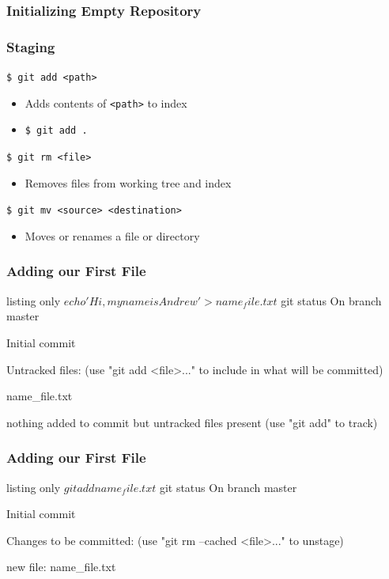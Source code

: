 \documentclass[english,compress]{beamer}
\begin{document}
\begin{frame}[fragile]
    \frametitle{Initializing Empty Repository}
\end{frame}

\begin{frame}[fragile]
    \frametitle{Staging}
    \verb|$ git add <path>|
    \begin{itemize}
        \item Adds contents of \verb|<path>| to index
        \item \verb|$ git add .|
    \end{itemize}
    
    \verb|$ git rm <file>|
    \begin{itemize}
        \item Removes files from working tree and index
    \end{itemize}

    \verb|$ git mv <source> <destination>|
    \begin{itemize}
        \item Moves or renames a file or directory
    \end{itemize}
\end{frame}

\begin{frame}[fragile]
    \frametitle{Adding our First File}
    \begin{tcblisting}{listing only}
$ echo 'Hi, my name is Andrew' > name_file.txt
$ git status
On branch master

Initial commit

Untracked files:
  (use "git add <file>..." to include in what will be committed)

	name_file.txt

nothing added to commit but untracked files present (use "git add" to track)
    \end{tcblisting}
\end{frame}

\begin{frame}[fragile]
    \frametitle{Adding our First File}
    \begin{tcblisting}{listing only}
$ git add name_file.txt
$ git status 
On branch master

Initial commit

Changes to be committed:
  (use "git rm --cached <file>..." to unstage)

	new file:   name_file.txt
    \end{tcblisting}
\end{frame}
\end{document}
